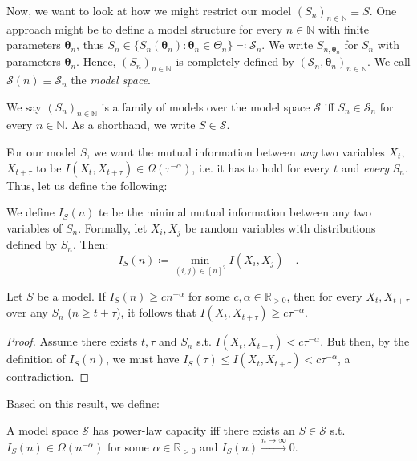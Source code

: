 \documentclass[../../main.tex]{subfiles}
\begin{document}
    Now, we want to look at how we might restrict our model $(S_n)_{n \in \mathbb{N}} \equiv S$. One approach might be to define a model structure for every $n \in \mathbb{N}$ with finite parameters $\bm{\theta}_n$, thus $S_n \in \{ S_n(\bm{\theta}_n) : \bm{\theta}_n \in \Theta_n \} \eqqcolon \mathcal{S}_n$. We write $S_{n, \bm{\theta}_n}$ for $S_n$ with parameters $\bm{\theta}_n$. Hence, $(S_n)_{n \in \mathbb{N}}$ is completely defined by $(\mathcal{S}_n, \bm{\theta}_n)_{n \in \mathbb{N}}$. We call $\mathcal{S}(n) \equiv \mathcal{S}_n$ the \emph{model space}.

    \begin{definition}
        We say $(S_n)_{n \in \mathbb{N}}$ is a family of models over the model space $\mathcal{S}$ iff $S_n \in \mathcal{S}_n$ for every $n \in \mathbb{N}$. As a shorthand, we write $S \in \mathcal{S}$.
    \end{definition}

    For our model $S$, we want the mutual information between \emph{any} two variables $X_t$, $X_{t + \tau}$ to be $I(X_t, X_{t + \tau}) \in \Omega(\tau^{-\alpha})$, i.e. it has to hold for every $t$ and \emph{every} $S_n$. Thus, let us define the following:

    \begin{definition}
        We define $I_S(n)$ te be the minimal mutual information between any two variables of $S_n$. Formally, let $X_i, X_j$ be random variables with distributions defined by $S_n$. Then:
        \[
            I_S(n) \coloneqq \min_{(i, j) \in [n]^2} I(X_i, X_j) \quad .
        \]
    \end{definition}

    \begin{theorem}
        Let $S$ be a model. If $I_S(n) \geq c n^{-\alpha}$ for some $c, \alpha \in \mathbb{R}_{>0}$, then for every $X_t, X_{t + \tau}$ over any $S_n$ ($n \geq t + \tau$), it follows that $I(X_t, X_{t + \tau}) \geq c\tau^{-\alpha}$.
    \end{theorem}

    \begin{proof}
        Assume there exists $t, \tau$ and $S_n$ s.t. $I(X_t, X_{t + \tau}) < c\tau^{-\alpha}$. But then, by the definition of $I_S(n)$, we must have $I_S(\tau)\leq I(X_t, X_{t + \tau}) < c\tau^{-\alpha}$, a contradiction.
    \end{proof}

    Based on this result, we define:

    \begin{definition}
        A model space $\mathcal{S}$ has power-law capacity iff there exists an $S \in \mathcal{S}$ s.t. $I_S(n) \in \Omega(n^{-\alpha})$ for some $\alpha \in \mathbb{R}_{>0}$ and $I_S(n) \xrightarrow{n \to \infty} 0$.
    \end{definition}
\end{document}
